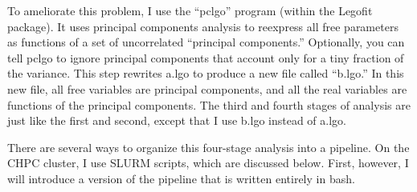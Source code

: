 \documentclass[11pt]{article}
\begin{document}
To ameliorate this problem, I use the ``pclgo'' program (within the
Legofit package). It uses principal components analysis to reexpress
all free parameters as functions of a set of uncorrelated ``principal
components.'' Optionally, you can tell pclgo to ignore principal
components that account only for a tiny fraction of the variance. This
step rewrites a.lgo to produce a new file called ``b.lgo.'' In this
new file, all free variables are principal components, and all the
real variables are functions of the principal components.  The third
and fourth stages of analysis are just like the first and second,
except that I use b.lgo instead of a.lgo.

There are several ways to organize this four-stage analysis into a
pipeline. On the CHPC cluster, I use SLURM scripts, which are
discussed below. First, however, I will introduce a version of the
pipeline that is written entirely in bash.
\end{document}
